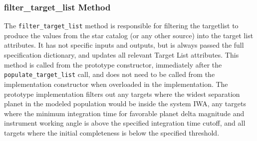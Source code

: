 \documentclass[cleanfoot]{asme2ej}
\begin{document}
\subsubsection{filter\_target\_list Method}  \label{sec:filtertargetlisttask}
The \verb+filter_target_list+ method is responsible for filtering the targetlist to produce the values from the star catalog  (or any other source) into the target list attributes. It has not specific inputs and outputs, but is always passed the full specification dictionary, and updates all relevant Target List attributes.  This method is called from the prototype constructor, immediately after the \verb+populate_target_list+ call, and does not need to be called from the implementation constructor when overloaded in the implementation.   The prototype implementation filters out any targets where the widest separation planet in the modeled population would be inside the system IWA, any targets where the minimum integration time for favorable planet delta magnitude and instrument working angle is above the specified integration time cutoff, and all targets where the initial completeness is below the specified threshold. 
\end{document}
